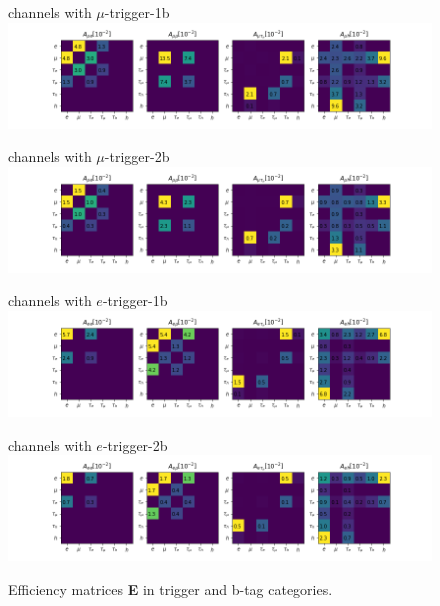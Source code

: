 \begin{figure}[ht]
    \centering
    channels with $\mu$-trigger-1b \\
    \includegraphics[width=15cm]{chapters/Analysis/sectionStatisticalAnalysis/figures/acc_mu1b.png}
    
    channels with $\mu$-trigger-2b \\
    \includegraphics[width=15cm]{chapters/Analysis/sectionStatisticalAnalysis/figures/acc_mu2b.png}
    
    channels with $e$-trigger-1b \\
    \includegraphics[width=15cm]{chapters/Analysis/sectionStatisticalAnalysis/figures/acc_e1b.png}
    
    channels with $e$-trigger-2b \\
    \includegraphics[width=15cm]{chapters/Analysis/sectionStatisticalAnalysis/figures/acc_e2b.png}
    
    \caption{ Efficiency matrices \textbf{E} in trigger and b-tag categories. }
    \label{efficencyMatrix}
\end{figure}


